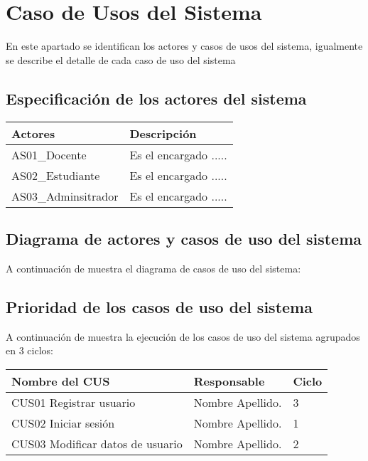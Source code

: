 \chapter{Caso de Usos del Sistema}

En este apartado se identifican los actores y casos de usos del sistema, igualmente se describe 
el detalle de cada caso de uso del sistema


\section{Especificación de los actores del sistema}


	\begin{table}[h!]	
		\begin{tabular}{ |p{4cm}|p{9cm}| }	\hline
			
			\rowcolor{gray!50}  \textbf{Actores}  &  \textbf{Descripción} \\ \hline
			
			AS01\_Docente & Es el encargado .....  \\	\hline
			
			AS02\_Estudiante & Es el encargado .....  \\	\hline
			
			AS03\_Adminsitrador & Es el encargado .....  \\	\hline
			
		\end{tabular}
	\end{table}	


\section{Diagrama de actores y casos de uso del sistema}

A continuación de muestra el diagrama de casos de uso del sistema:

 
\section{Prioridad de los casos de uso del sistema}

A continuación de muestra la ejecución de los casos de uso del sistema agrupados en 3 ciclos:
	\begin{table}[h!]	
		\begin{tabular}{ |p{4cm}|p{7cm}|p{3cm}| }	\hline
			
			\rowcolor{gray!50}  \textbf{Nombre del CUS}  &  \textbf{Responsable } &  \textbf{Ciclo} \\ \hline
			
			CUS01 Registrar usuario  &  Nombre Apellido. &  3   \\	\hline
			
			CUS02 Iniciar sesión  &  Nombre Apellido. &  1   \\	\hline
		
			CUS03 Modificar datos de usuario  &  Nombre Apellido. &  2   \\	\hline
			
		\end{tabular}
	\end{table}	


